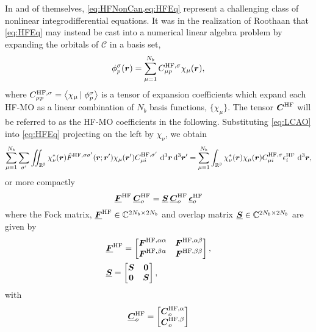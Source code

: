 In and of themselves, \cref{eq:HFNonCan,eq:HFEq} represent a challenging class of nonlinear integrodifferential equations. It was in the
realization of Roothaan  that \cref{eq:HFEq} may instead be cast into a numerical linear algebra problem by expanding the
orbitals of $\mathcal{C}$ in a basis set,
\begin{equation}
\label{eq:LCAO}
\phi^\sigma_p(\boldsymbol{r}) = \sum_{\mu = 1}^{N_b} C^{\mathrm{HF},\sigma}_{\mu p} \chi_\mu(\boldsymbol{r}),
\end{equation}
where $C^{\mathrm{HF},\sigma}_{\mu p} = \left\langle \chi_\mu \left\vert\right. \phi^\sigma_p \right\rangle$ is a tensor of expansion coefficients which expand each HF-MO as a linear 
combination of $N_b$ basis functions, $\{\chi_\mu\}$. The tensor $\boldsymbol{C}^{\mathrm{HF}}$ will be referred to as the HF-MO coefficients in the following.
Substituting \cref{eq:LCAO} into \cref{eq:HFEq} projecting on the left by $\chi_\nu$, we obtain
\begin{equation}
 \sum_{\mu = 1}^{N_b} \sum_{\sigma'} \int\mkern-12mu\int_{\mathbb R^3} \chi^*_\nu(\boldsymbol{r}) \hat{F}^{\mathrm{HF},\sigma\sigma'}(\boldsymbol{r}; \boldsymbol{r}') \chi_\mu(\boldsymbol{r}') C_{\mu i}^{\mathrm{HF},\sigma'}  
   \,\,\mathrm{d}^3\boldsymbol{r}\,\mathrm{d}^3\boldsymbol{r}' = \sum_{\mu = 1}^{N_b} \int_{\mathbb R^3} \chi^*_\nu(\boldsymbol{r}) \chi_\mu(\boldsymbol{r}) C_{\mu i}^{\mathrm{HF},\sigma} \epsilon^{\mathrm{HF}}_i \,\,\mathrm{d}^3\boldsymbol{r},
\end{equation}
or more compactly
\begin{equation}
\label{eq:OccRHEq}
\boldsymbol{\underline{F}}^{\mathrm{HF}} \,\boldsymbol{\underline{C}}^{\mathrm{HF}}_o = \boldsymbol{\underline{S}}\, \boldsymbol{\underline{C}}^{\mathrm{HF}}_o\, \boldsymbol{\underline{\epsilon}}_o^{\mathrm{HF}}
\end{equation}
where the Fock matrix, $\boldsymbol{\underline{F}}^{\mathrm{HF}} \in \mathbb{C}^{2N_b \times 2N_b}$ and overlap matrix $\boldsymbol{\underline{S}} \in \mathbb{C}^{2N_b \times 2N_b}$
are given by
\begin{align}
&\boldsymbol{\underline{F}}^{\mathrm{HF}} = \begin{bmatrix} \boldsymbol{F}^{\mathrm{HF},{\alpha\alpha}} & \boldsymbol{F}^{\mathrm{HF},{\alpha\beta}} \\ \boldsymbol{F}^{\mathrm{HF},{\beta\alpha}} & \boldsymbol{F}^{\mathrm{HF},{\beta\beta}} \end{bmatrix}, \\
&\boldsymbol{\underline{S}} = \begin{bmatrix} \boldsymbol{S} & \boldsymbol{0} \\ \boldsymbol{0} & \boldsymbol{S} \end{bmatrix},
\end{align}
with
\begin{equation}
  \boldsymbol{\underline{C}}_o^{\mathrm{HF}} = \begin{bmatrix} \boldsymbol{C}_o^{\mathrm{HF},\alpha} \\ \boldsymbol{C}_o^{\mathrm{HF},\beta} \end{bmatrix}
\end{equation}
